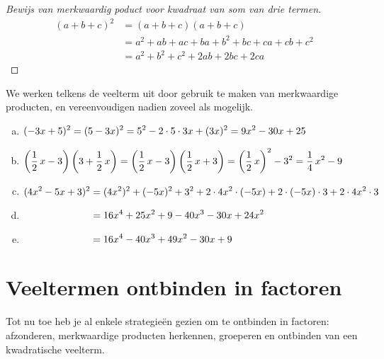 \documentclass{ximera}
\begin{document}
\begin{proof}[Bewijs van merkwaardig poduct voor kwadraat van som van drie termen]

\begin{align}
(a+b+c)^2 
& = (a+b+c)(a+b+c) \nonumber \\
& = a^2 + ab + ac + ba + b^2 + bc + ca + cb + c^2 \nonumber \\
& = a^2 + b^2 + c^2 + 2ab + 2bc + 2ca \tag*{\qedhere}
\end{align}

\end{proof}


\begin{example} 
We werken telkens de veelterm uit door gebruik te maken van merkwaardige producten, en vereenvoudigen nadien zoveel als mogelijk.
\begin{enumerate}[(a)]
\item 
$\displaystyle (-3x+5)^2 = (5-3x)^2 = 5^2 - 2 \cdot 5 \cdot 3x + (3x)^2 = 9x^2 - 30x + 25$
\item 
$\displaystyle \left(\frac{1}{2}\,x-3\right)\left(3+\frac{1}{2}\,x\right) = \left(\frac{1}{2}\,x-3\right)\left(\frac{1}{2}\,x+3\right) = \left(\frac{1}{2}\,x\right)^2 - 3^2 = \frac{1}{4}\,x^2 - 9$
\item
$\displaystyle (4x^2 - 5x + 3)^2 = (4x^2)^2 + (-5x)^2 + 3^2 + 2 \cdot 4x^2 \cdot (-5x) + 2\cdot (-5x) \cdot 3 + 2 \cdot 4x^2 \cdot 3$
\item[]
$\D \mph{(4x^2 - 5x + 3)^2} = 16x^4 + 25x^2 + 9 -40x^3 - 30x + 24x^2$
\item[]
$\D \mph{(4x^2 - 5x + 3)^2} = 16x^4 - 40x^3 + 49x^2 - 30x + 9$
\end{enumerate}
\end{example} 

\section{Veeltermen ontbinden in factoren}

Tot nu toe heb je al enkele strategie\"en gezien om te ontbinden in factoren: afzonderen, merkwaardige producten herkennen, groeperen en ontbinden van een kwadratische veelterm.
\end{document}
